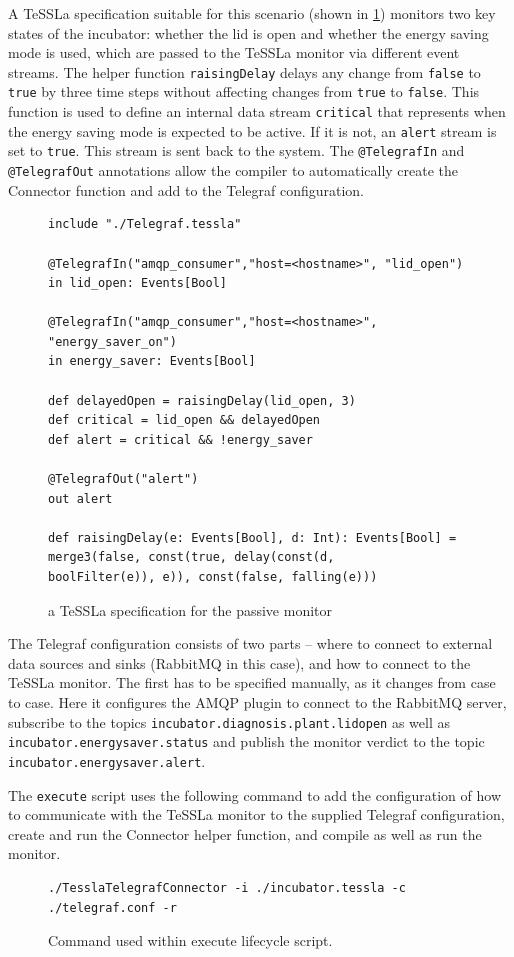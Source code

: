 A TeSSLa specification suitable for this scenario (shown in \cref{fig:tessla_spec_passive}) monitors two key states of the incubator: whether the lid is open and whether the energy saving mode is used, which are passed to the TeSSLa monitor via different event streams.
The helper function \lstinline{raisingDelay} delays any change from \lstinline{false} to \lstinline{true} by three time steps without affecting changes from \lstinline{true} to \lstinline{false}.
This function is used to define an internal data stream \lstinline{critical} that represents when the energy saving mode is expected to be active.
If it is not, an \lstinline{alert} stream is set to \lstinline{true}.
This stream is sent back to the system.
The \lstinline{@TelegrafIn} and \lstinline{@TelegrafOut} annotations allow the compiler to automatically create the Connector function and add to the Telegraf configuration.
%
\begin{figure}[ht]
	\centering
	\begin{lstlisting}
include "./Telegraf.tessla"

@TelegrafIn("amqp_consumer","host=<hostname>", "lid_open")
in lid_open: Events[Bool]

@TelegrafIn("amqp_consumer","host=<hostname>",               "energy_saver_on")
in energy_saver: Events[Bool]

def delayedOpen = raisingDelay(lid_open, 3)
def critical = lid_open && delayedOpen
def alert = critical && !energy_saver

@TelegrafOut("alert")
out alert

def raisingDelay(e: Events[Bool], d: Int): Events[Bool] = merge3(false, const(true, delay(const(d,      boolFilter(e)), e)), const(false, falling(e)))
	\end{lstlisting}
	\caption{a TeSSLa specification for the passive monitor}
	\label{fig:tessla_spec_passive}
\end{figure}%
%
The Telegraf configuration consists of two parts -- where to connect to external data sources and sinks (RabbitMQ in this case), and how to connect to the TeSSLa monitor.
The first has to be specified manually, as it changes from case to case.
Here it configures the AMQP plugin to connect to the RabbitMQ server, subscribe to the topics \lstinline{incubator.diagnosis.plant.lidopen} as well as \lstinline{incubator.energysaver.status} and publish the monitor verdict to the topic \lstinline{incubator.energysaver.alert}.

The \texttt{execute} script uses the following command to add the configuration of how to communicate with the TeSSLa monitor to the supplied Telegraf configuration, create and run the Connector helper function, and compile as well as run the monitor.%
%
\begin{figure}[ht]
	\centering
	\begin{lstlisting}
./TesslaTelegrafConnector -i ./incubator.tessla -c ./telegraf.conf -r
	\end{lstlisting}
	\caption{Command used within execute lifecycle script.}
\end{figure}%

